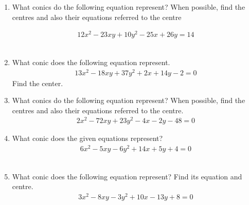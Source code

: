 \renewcommand{\theequation}{\theenumi}
\renewcommand{\thefigure}{\theenumi}
\begin{enumerate}[label=\thesection.\arabic*.,ref=\thesection.\theenumi]
%
\item What conics do the following equation represent? When possible, find the centres and also their equations referred to the centre

\begin{align}
12x^2-23xy+10y^2-25x+26y=14\label{eq:solutions/40/1/ques}
\end{align}
\\
\solution

\item What conic does the following equation represent. 
\begin{align}
13x^2-18xy+37y^2+2x+14y-2 = 0
\end{align}
Find the center.
\\
\solution

%
\item What conics do the following equation represent? When possible, find the centres and also their equations referred to the centre.
\begin{align}
2x^2-72xy+23y^2-4x-2y-48=0\label{eq:solutions/40/4/ques}
\end{align}
\solution
%
\item What conic does the given equations represent?
\begin{align}
6x^2-5xy-6y^2+14x+5y+4=0
\end{align}
\\
\solution

\item What conic does the following equation represent? Find its equation and centre.
\begin{align*}
	3x^2 - 8xy - 3y^2 + 10x - 13y + 8 =0 
\end{align*}
\solution

\end{enumerate}


